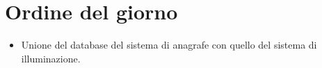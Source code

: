 \section{Ordine del giorno}

\begin{itemize}
    \item Unione del database del sistema di anagrafe con quello del sistema di illuminazione.
\end{itemize}